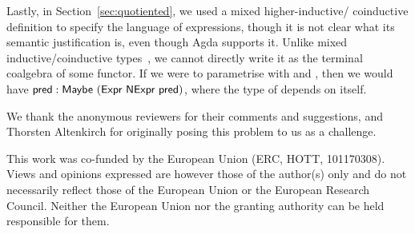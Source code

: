 \documentclass[sigplan, screen, natbib=false]{acmart}
\begin{document}
Lastly, in Section~\ref{sec:quotiented}, we used a mixed higher-inductive\slash
coinductive definition to specify the language of expressions, though it is not
clear what its semantic justification is, even though Agda supports it. Unlike
mixed inductive\slash coinductive types~\cite{ghani-stream}, we cannot directly
write it as the terminal coalgebra of some functor. If we were to parametrise
 with  and , then we would
have $ : \AgdaDatatype{Maybe}\ (\AgdaDatatype{Expr}\
\AgdaRecord{NExpr}\ \AgdaField{pred})$, where the type of \AgdaField{pred}
depends on itself.

\begin{acks}
  We thank the anonymous reviewers for their comments and suggestions, and
  Thorsten Altenkirch for originally posing this problem to us as a challenge.

  This work was co-funded by the European Union (ERC, HOTT, 101170308). Views
  and opinions expressed are however those of the author(s) only and do not
  necessarily reflect those of the European Union or the European Research
  Council. Neither the European Union nor the granting authority can be held
  responsible for them.
\end{acks}

\printbibliography
\end{document}
